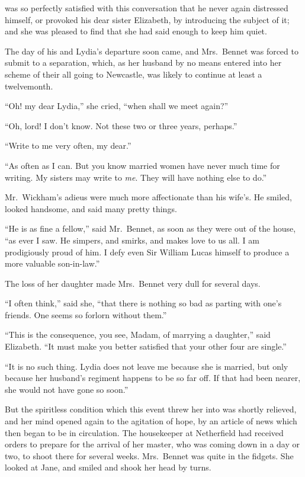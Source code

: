  was so perfectly satisfied with this conversation
that he never again distressed himself, or provoked his dear
sister Elizabeth, by introducing the subject of it; and she was
pleased to find that she had said enough to keep him quiet.

The day of his and Lydia's departure soon came, and Mrs.\ Bennet
was forced to submit to a separation, which, as her husband by
no means entered into her scheme of their all going to
Newcastle, was likely to continue at least a twelvemonth.

``Oh! my dear Lydia,'' she cried, ``when shall we meet again?''

``Oh, lord! I don't know.  Not these two or three years,
perhaps.''

``Write to me very often, my dear.''

``As often as I can.  But you know married women have never much
time for writing.  My sisters may write to \emph{me}.  They will
have nothing else to do.''

Mr.\ Wickham's adieus were much more affectionate than his
wife's.  He smiled, looked handsome, and said many pretty
things.

``He is as fine a fellow,'' said Mr.\ Bennet, as soon as they were
out of the house, ``as ever I saw.  He simpers, and smirks, and
makes love to us all.  I am prodigiously proud of him.  I defy
even Sir William Lucas himself to produce a more valuable
son-in-law.''

The loss of her daughter made Mrs.\ Bennet very dull for
several days.

``I often think,'' said she, ``that there is nothing so bad as
parting with one's friends.  One seems so forlorn without
them.''

``This is the consequence, you see, Madam, of marrying a daughter,''
said Elizabeth.  ``It must make you better satisfied that your
other four are single.''

``It is no such thing.  Lydia does not leave me because she is
married, but only because her husband's regiment happens to be
so far off.  If that had been nearer, she would not have gone
so soon.''

But the spiritless condition which this event threw her into
was shortly relieved, and her mind opened again to the
agitation of hope, by an article of news which then began to be
in circulation.  The housekeeper at Netherfield had received
orders to prepare for the arrival of her master, who was coming
down in a day or two, to shoot there for several weeks.
Mrs.\ Bennet was quite in the fidgets.  She looked at Jane, and
smiled and shook her head by turns.


